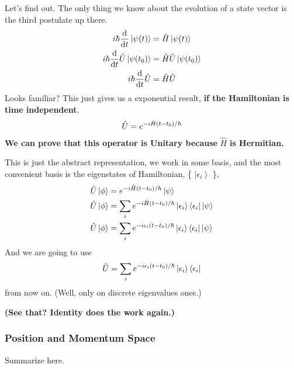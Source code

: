 \documentclass[letterpaper,10pt,english]{sphinxmanual}
\def\d{{\rm d}}
\newcommand{\bra}[1]{\left\langle #1\right|}
\newcommand{\ket}[1]{\left| #1\right\rangle}
\begin{document}
\begin{itemize}
Let's find out. The only thing we know about the evolution of a state vector is the third postulate up there.
\begin{gather}
\begin{split}i\hbar \frac{\d }{\d t}\ket{\psi(t)} & =  \hat H \ket{\psi(t)} \\
i\hbar \frac{\d }{\d t}\hat U \ket{\psi(t_0)} & =  \hat H \hat U \ket{\psi(t_0)} \\
i\hbar \frac{\d }{\d t}\hat U & =  \hat H \hat U\end{split}\notag
\end{gather}
Looks familiar? This just gives us a exponential result, \textbf{if the Hamiltonian is time independent}.
\begin{gather}
\begin{split}\hat U = e^{- i \hat H (t-t_0)/\hbar}\end{split}\notag
\end{gather}
\textbf{We can prove that this operator is Unitary because} \(\hat H\) \textbf{is Hermitian.}

This is just the abstract representation, we work in some basis, and the most convenient basis is the eigenstates of Hamiltonian, \{ \(\ket{\epsilon_i}\) \},
\begin{gather}
\begin{split}\hat U \ket{\phi} & =  e^{- i \hat H (t-t_0)/\hbar} \ket{\psi}   \\
\hat U \ket{\phi} & =  \sum_i e^{- i \hat H (t-t_0)/\hbar} \ket{\epsilon_i}\bra{\epsilon_i}  \ket{\psi}  \\
      \hat U \ket{\phi} & =  \sum_i e^{- i \epsilon_i (t-t_0)/\hbar} \ket{\epsilon_i}\bra{\epsilon_i}  \ket{\psi}\end{split}\notag
\end{gather}
And we are going to use
\begin{gather}
\begin{split}\hat U = \sum_i e^{- i \epsilon_i (t-t_0)/\hbar} \ket{\epsilon_i}\bra{\epsilon_i}\end{split}\notag
\end{gather}
from now on. (Well, only on discrete eigenvalues ones.)

\textbf{(See that? Identity does the work again.)}

\end{itemize}


\subsubsection{Position and Momentum Space}
\label{Quantum/QuantumMechanics:position-and-momentum-space}
Summarize here.
\end{document}
